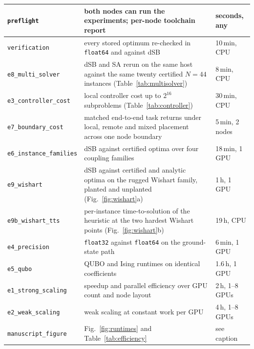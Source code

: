 \documentclass[preprint,12pt,a4paper]{elsarticle}
\begin{document}
\begin{longtable}{|p{4.2cm}|p{5.3cm}|p{2.0cm}|}
\texttt{preflight} & both nodes can run the experiments; per-node toolchain
report & seconds, any \\
\hline
\texttt{verification} & every stored optimum re-checked in \texttt{float64} and
against dSB & 10\,min, CPU \\
\hline
\texttt{e8\_multi\_solver} & dSB and SA rerun on the same host against the same twenty certified
$N=44$ instances (Table~\ref{tab:multisolver}) & 8\,min, CPU \\
\hline
\texttt{e3\_controller\_cost} & local controller cost up to $2^{16}$ subproblems
(Table~\ref{tab:controller}) & 30\,min, CPU \\
\hline
\texttt{e7\_boundary\_cost} & matched end-to-end task returns under local, remote and mixed
placement across one node boundary & 5\,min, 2 nodes \\
\hline
\texttt{e6\_instance\_families} & dSB against certified optima over four
coupling families & 18\,min, 1 GPU \\
\hline
\texttt{e9\_wishart} & dSB against certified and analytic optima on the rugged
Wishart family, planted and unplanted (Fig.~\ref{fig:wishart}a) & 1\,h, 1 GPU \\
\hline
\texttt{e9b\_wishart\_tts} & per-instance time-to-solution of the heuristic at the
two hardest Wishart points (Fig.~\ref{fig:wishart}b) & 19\,h, CPU \\
\hline
\texttt{e4\_precision} & \texttt{float32} against \texttt{float64} on the
ground-state path & 6\,min, 1 GPU \\
\hline
\texttt{e5\_qubo} & QUBO and Ising runtimes on identical coefficients &
1.6\,h, 1 GPU \\
\hline
\texttt{e1\_strong\_scaling} & speedup and parallel efficiency over GPU count
and node layout & 2\,h, 1--8 GPUs \\
\hline
\texttt{e2\_weak\_scaling} & weak scaling at constant work per GPU &
4\,h, 1--8 GPUs \\
\hline
\texttt{manuscript\_figure} & Fig.~\ref{fig:runtimes} and
Table~\ref{tab:efficiency} & see caption \\

\end{longtable}
\end{document}
